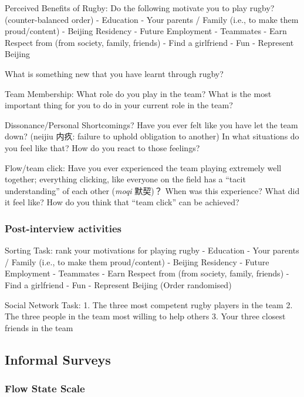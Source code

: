 \begin{CJK}{UTF8}{gbsn}
  Perceived Benefits of Rugby:
  Do the following motivate you to play rugby? (counter-balanced order)
  - Education
  - Your parents / Family (i.e., to make them proud/content)
  - Beijing Residency
  - Future Employment
  - Teammates
  - Earn Respect from (from society, family, friends)
  - Find a girlfriend
  - Fun
  - Represent Beijing

  What is something new that you have learnt through rugby?

  Team Membership:
  What role do you play in the team?
  What is the most important thing for you to do in your current role in the team?

  Dissonance/Personal Shortcomings?
  Have you ever felt like you have let the team down?  (neijiu 内疚: failure to uphold obligation to another)
  In what situations do you feel like that?
  How do you react to those feelings?

  Flow/team click:
  Have you ever experienced the team playing extremely well together; everything clicking, like everyone on the field has a ``tacit understanding'' of each other (\textit{moqi} 默契)？
  When was this experience?
  What did it feel like?
  How do you think that “team click” can be achieved?


  \subsubsection{Post-interview activities\label{sect:postInterview}}


  Sorting Task: rank your motivations for playing rugby
  - Education
  - Your parents / Family (i.e., to make them proud/content)
  - Beijing Residency
  - Future Employment
  - Teammates
  - Earn Respect from (from society, family, friends)
  - Find a girlfriend
  - Fun
  - Represent Beijing
  (Order randomised)

  Social Network Task:
  1.	The three most competent rugby players in the team
  2.	The three people in the team most willing to help others
  3.	Your three closest friends in the team



  \subsection{Informal Surveys}



        \subsubsection{Flow State Scale\label{sect:flowStateScale}}


\end{CJK}
